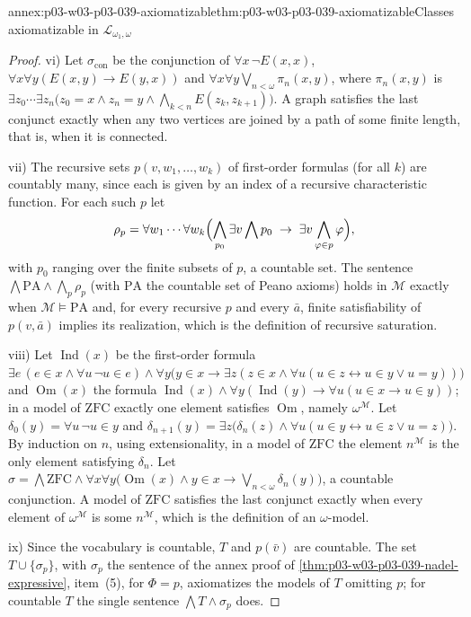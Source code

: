 \begin{annexitem}{annex:p03-w03-p03-039-axiomatizable}{thm:p03-w03-p03-039-axiomatizable}{Classes axiomatizable in \(\mathcal L_{\omega_1,\omega}\)}
\begin{proof}
vi) Let \(\sigma_{\mathrm{con}}\) be the conjunction of
\(\forall x\,\neg E(x,x)\), \(\forall x\forall y(E(x,y)\to E(y,x))\) and
\(\forall x\forall y\bigvee_{n<\omega}\pi_n(x,y)\), where \(\pi_n(x,y)\) is
\(\exists z_0\cdots\exists z_n\bigl(z_0=x\wedge z_n=y\wedge\bigwedge_{k<n}E(z_k,z_{k+1})\bigr)\).
A graph satisfies the last conjunct exactly when any two vertices are joined
by a path of some finite length, that is, when it is connected.

vii) The recursive sets \(p(v,w_1,\dots,w_k)\) of first-order formulas (for
all \(k\)) are countably many, since each is given by an index of a
recursive characteristic function. For each such \(p\) let
\[
\rho_p=\forall w_1\cdots\forall w_k\Bigl(\bigwedge_{p_0}\exists v\bigwedge p_0\;\to\;\exists v\bigwedge_{\varphi\in p}\varphi\Bigr),
\]
with \(p_0\) ranging over the finite subsets of \(p\), a countable set. The
sentence \(\bigwedge\mathrm{PA}\wedge\bigwedge_p\rho_p\) (with \(\mathrm{PA}\)
the countable set of Peano axioms) holds in \(\mathcal M\) exactly when
\(\mathcal M\models\mathrm{PA}\) and, for every recursive \(p\) and every
\(\bar a\), finite satisfiability of \(p(v,\bar a)\) implies its
realization, which is the definition of recursive saturation.

viii) Let \(\operatorname{Ind}(x)\) be the first-order formula
\(\exists e\,(e\in x\wedge\forall u\,\neg u\in e)\wedge\forall y\bigl(y\in x\to\exists z(z\in x\wedge\forall u(u\in z\leftrightarrow u\in y\vee u=y))\bigr)\)
and \(\operatorname{Om}(x)\) the formula
\(\operatorname{Ind}(x)\wedge\forall y(\operatorname{Ind}(y)\to\forall u(u\in x\to u\in y))\);
in a model of \(\mathrm{ZFC}\) exactly one element satisfies
\(\operatorname{Om}\), namely \(\omega^{\mathcal M}\). Let
\(\delta_0(y)=\forall u\,\neg u\in y\) and
\(\delta_{n+1}(y)=\exists z\bigl(\delta_n(z)\wedge\forall u(u\in y\leftrightarrow u\in z\vee u=z)\bigr)\).
By induction on \(n\), using extensionality, in a model of \(\mathrm{ZFC}\)
the element \(n^{\mathcal M}\) is the only element satisfying \(\delta_n\).
Let \(\sigma=\bigwedge\mathrm{ZFC}\wedge\forall x\forall y\bigl(\operatorname{Om}(x)\wedge y\in x\to\bigvee_{n<\omega}\delta_n(y)\bigr)\),
a countable conjunction. A model of \(\mathrm{ZFC}\) satisfies the last
conjunct exactly when every element of \(\omega^{\mathcal M}\) is some
\(n^{\mathcal M}\), which is the definition of an \(\omega\)-model.

ix) Since the vocabulary is countable, \(T\) and \(p(\bar v)\) are countable.
The set \(T\cup\{\sigma_p\}\), with \(\sigma_p\) the sentence of the annex
proof of \cref{thm:p03-w03-p03-039-nadel-expressive}, item~(5), for
\(\Phi=p\), axiomatizes the models of \(T\) omitting \(p\); for countable
\(T\) the single sentence \(\bigwedge T\wedge\sigma_p\) does.
\end{proof}
\end{annexitem}

